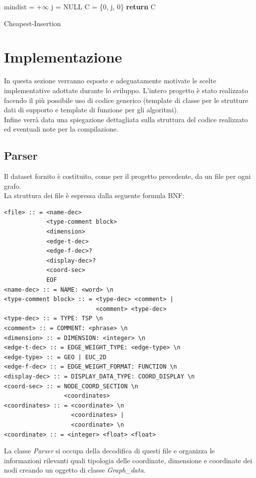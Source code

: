 \documentclass[]{article}
\begin{document}
\begin{algorithm}[H]
	\SetAlgoLined
	\DontPrintSemicolon
	mindist = +$\infty$\; 
	j = NULL 
	C = \{0, j, 0\}
	\textbf{return} C\;
	\caption{Cheapest-Insertion}
\end{algorithm}
\section{Implementazione}
In questa sezione verranno esposte e adeguatamente motivate le scelte implementative adottate durante lo sviluppo. L'intero progetto è stato realizzato facendo il più possibile uso di codice generico (template di classe per le strutture dati di supporto e template di funzione per gli algoritmi).\\
Infine verrà data una spiegazione dettagliata sulla struttura del codice realizzato ed eventuali note per la compilazione.
\subsection{Parser}
Il dataset fornito è costituito, come per il progetto precedente, da un file per ogni grafo.\\
La struttura dei file è espressa dalla seguente formula BNF:
\begin{verbatim}
<file> :: = <name-dec>
            <type-comment block>
            <dimension>
            <edge-t-dec>
            <edge-f-dec>?
            <display-dec>?
            <coord-sec>
            EOF
<name-dec> :: = NAME: <word> \n
<type-comment block> :: = <type-dec> <comment> | 
                          <comment> <type-dec>
<type-dec> :: = TYPE: TSP \n
<comment> :: = COMMENT: <phrase> \n
<dimension> :: = DIMENSION: <integer> \n
<edge-t-dec> :: = EDGE_WEIGHT_TYPE: <edge-type> \n
<edge-type> :: = GEO | EUC_2D
<edge-f-dec> :: = EDGE_WEIGHT_FORMAT: FUNCTION \n
<display-dec> :: = DISPLAY_DATA_TYPE: COORD_DISPLAY \n
<coord-sec> :: = NODE_COORD_SECTION \n
                 <coordinates>
<coordinates> :: = <coordinate> \n
                   <coordinates> |
                   <coordinate> \n
<coordinate> :: = <integer> <float> <float>
\end{verbatim}
La classe \textit{Parser} si occupa della decodifica di questi file e organizza le informazioni rilevanti quali tipologia delle coordinate, dimensione e coordinate dei nodi creando un oggetto di classe \textit{Graph\_data}.
\end{document}

